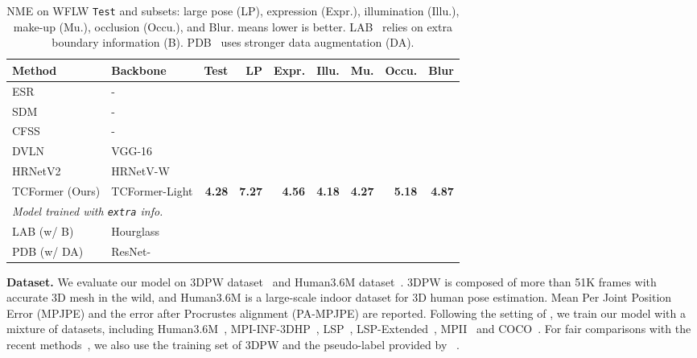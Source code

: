 \documentclass[10pt,twocolumn,letterpaper]{article}
\begin{document}
\begin{table*}[tb]
\centering
\caption{
NME on WFLW \texttt{Test} and  subsets: large pose (LP), expression (Expr.), illumination (Illu.), make-up (Mu.), occlusion (Occu.), and Blur.   means lower is better.
LAB~\cite{wu2018look} relies on extra boundary information (B). PDB~\cite{feng2018wing} uses stronger data augmentation (DA). 
}
\vspace{-2mm}
\label{table:comparison_wflw_testset}

\small
\begin{tabular}{l|l|r|r|r|r|r|r|r }
\hline \noalign{\smallskip}
Method   & Backbone & Test  & LP  & Expr.  & Illu.  & Mu.  & Occu.  & Blur \\
\hline

\hline
ESR \cite{cao2014face}& - &  &  &  &  &  &  & \\
SDM \cite{xiong2013supervised}& - & &  &  &  &  &  & \\
CFSS \cite{zhu2015face}& - & &  &  &  &  &  & \\
DVLN \cite{wu2017leveraging} & VGG-16& &  &  &  &  &  & \\
\hline
HRNetV2 \cite{wang2020deep} & HRNetV-W &  &  &  &  &  &  & \\
TCFormer (Ours) & TCFormer-Light & \textbf{4.28} & \textbf{7.27} & \textbf{4.56} & \textbf{4.18} & \textbf{4.27} & \textbf{5.18}  &  \textbf{4.87}\\
\hline
\hline
\multicolumn{3}{l}{
\emph {Model trained with \texttt{extra} info.}}\\
\hline
LAB (w/ B)~\cite{wu2018look}& Hourglass &  &  &  &  &  &  & \\
PDB (w/ DA)~\cite{feng2018wing}& ResNet- &  &  &  &  &  &  & \\
\hline
\end{tabular} 
\end{table*}


\textbf{Dataset.}
We evaluate our model on 3DPW dataset~\cite{von2018recovering} and Human3.6M dataset~\cite{ionescu2013human3}. 3DPW is composed of more than 51K frames with accurate 3D mesh in the wild, and Human3.6M is a large-scale indoor dataset for 3D human pose estimation.
Mean Per Joint Position Error (MPJPE) and the error after Procrustes alignment (PA-MPJPE) are reported.
Following the setting of \cite{kanazawa2018end}, we train our model with a mixture of datasets, including Human3.6M~\cite{ionescu2013human3}, MPI-INF-3DHP~\cite{mehta2017monocular}, LSP~\cite{Johnson10}, LSP-Extended~\cite{johnson2011learning}, MPII~\cite{andriluka20142d} and COCO~\cite{lin2014microsoft}. For fair comparisons with the recent methods~\cite{joo2020exemplar,dwivedi2021learning}, we also use the training set of 3DPW and the pseudo-label provided by ~\cite{joo2020exemplar}.
\end{document}
